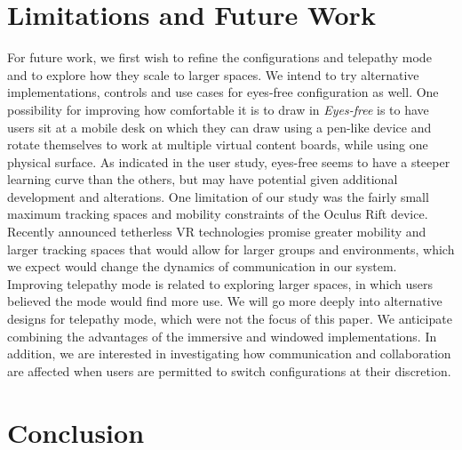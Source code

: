 \documentclass[chi_draft]{sigchi}
\begin{document}
\section{Limitations and Future Work}
For future work, we first wish to refine the configurations and telepathy mode and to explore how they scale to larger spaces. We intend to try alternative implementations, controls and use cases for eyes-free configuration as well. One possibility for improving how comfortable it is to draw in \textit{Eyes-free} is to have users sit at a mobile desk on which they can draw using a pen-like device and rotate themselves to work at multiple virtual content boards, while using one physical surface. As indicated in the user study, eyes-free seems to have a steeper learning curve than the others, but may have potential given additional development and alterations.
One limitation of our study was the fairly small maximum tracking spaces and mobility constraints of the Oculus Rift device. Recently announced tetherless VR technologies promise greater mobility and larger tracking spaces that would allow for larger groups and environments, which we expect would change the dynamics of communication in our system. Improving telepathy mode is related to exploring larger spaces, in which users believed the mode would find more use. We will go more deeply into alternative designs for telepathy mode, which were not the focus of this paper. We anticipate combining the advantages of the immersive and windowed implementations.
In addition, we are interested in investigating how communication and collaboration are affected when users are permitted to switch configurations at their discretion.

\section{Conclusion}
\end{document}
